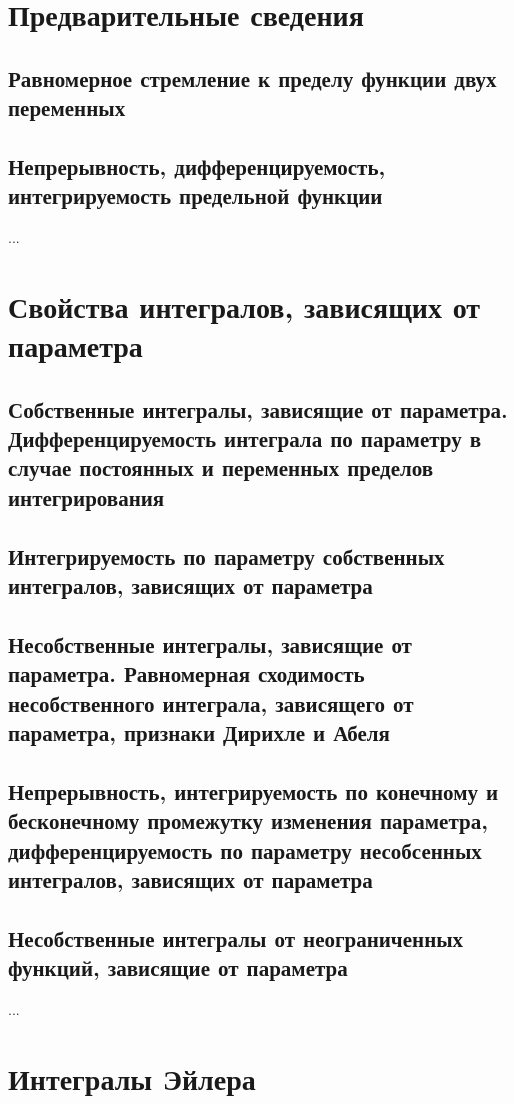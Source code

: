 \section{Предварительные сведения}
\subsection{Равномерное стремление к пределу функции двух переменных}
\subsection{Непрерывность, дифференцируемость, интегрируемость предельной функции}
...

\section{Свойства интегралов, зависящих от параметра}
\subsection{Собственные интегралы, зависящие от параметра. Дифференцируемость интеграла по параметру в случае постоянных и переменных пределов интегрирования}
\subsection{Интегрируемость по параметру собственных интегралов, зависящих от параметра}
\subsection{Несобственные интегралы, зависящие от параметра. Равномерная сходимость несобственного интеграла, зависящего от параметра, признаки Дирихле и Абеля}
\subsection{Непрерывность, интегрируемость по конечному и бесконечному промежутку изменения параметра, дифференцируемость по параметру несобсенных интегралов, зависящих от параметра}
\subsection{Несобственные интегралы от неограниченных функций, зависящие от параметра}
...

\section{Интегралы Эйлера}
